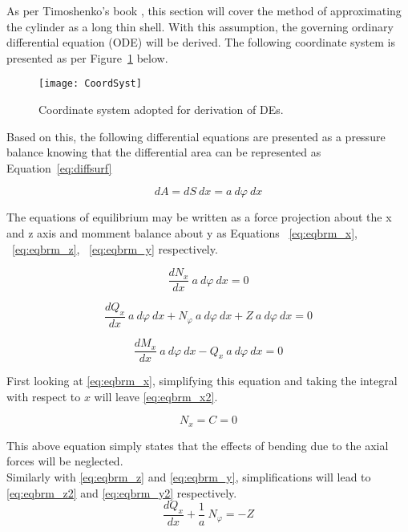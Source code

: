 As per Timoshenko's book \cite{timoshenko1959theory}, this section will cover the method of approximating the cylinder as a long thin shell. With this assumption, the governing ordinary differential equation (ODE) will be derived. The following coordinate system is presented as per Figure~\ref{fig:CoordSyst} below.

\begin{figure}[H]
	\centering
	\texttt{[image: CoordSyst]}
	\caption{Coordinate system adopted for derivation of DEs.}
	\label{fig:CoordSyst}
\end{figure}

Based on this, the following differential equations are presented as a pressure balance knowing that the differential area can be represented as Equation~\ref{eq:diffsurf}
 
\begin{equation}
	\label{eq:diffsurf}
	dA = dS\ dx = a\ d\varphi \ dx   
\end{equation}

The equations of equilibrium may be written as a force projection about the x and z axis and momment balance about y as Equations ~\ref{eq:eqbrm_x}, ~\ref{eq:eqbrm_z}, ~\ref{eq:eqbrm_y} respectively.

\begin{equation}
	\label{eq:eqbrm_x}
	\frac{dN_x}{dx}\ a\ d\varphi \ dx = 0
\end{equation}

\begin{equation}
	\label{eq:eqbrm_z}
	\frac{dQ_x}{dx}\ a\ d\varphi \ dx+ N_\varphi \ a\ d\varphi \ dx +Z\ a\ d\varphi \ dx= 0
\end{equation}

\begin{equation}
	\label{eq:eqbrm_y}
	\frac{dM_x}{dx}\ a\ d\varphi \ dx- Q_x\ a\ d\varphi \ dx= 0
\end{equation}

First looking at \ref{eq:eqbrm_x}, simplifying this equation and taking the integral with respect to $x$ will leave \ref{eq:eqbrm_x2}. 

\begin{equation}
	\label{eq:eqbrm_x2}
	N_x = C = 0 
\end{equation}

This above equation simply states that the effects of bending due to the axial forces will be neglected.\\

Similarly with \ref{eq:eqbrm_z} and \ref{eq:eqbrm_y}, simplifications will lead to \ref{eq:eqbrm_z2} and \ref{eq:eqbrm_y2} respectively.
\begin{equation}
	\label{eq:eqbrm_z2}
	\frac{dQ_x}{dx}+\frac{1}{a}\ N_\varphi = -Z
\end{equation}

